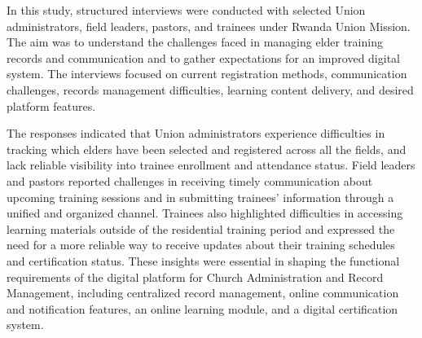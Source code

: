 \documentclass[12pt]{report}
\begin{document}
In this study, structured interviews were conducted with selected Union administrators, field leaders, pastors, and trainees under Rwanda Union Mission. The aim was to understand the challenges faced in managing elder training records and communication and to gather expectations for an improved digital system. The interviews focused on current registration methods, communication challenges, records management difficulties, learning content delivery, and desired platform features.

The responses indicated that Union administrators experience difficulties in tracking which elders have been selected and registered across all the fields, and lack reliable visibility into trainee enrollment and attendance status. Field leaders and pastors reported challenges in receiving timely communication about upcoming training sessions and in submitting trainees' information through a unified and organized channel. Trainees also highlighted difficulties in accessing learning materials outside of the residential training period and expressed the need for a more reliable way to receive updates about their training schedules and certification status. These insights were essential in shaping the functional requirements of the digital platform for Church Administration and Record Management, including centralized record management, online communication and notification features, an online learning module, and a digital certification system.
\end{document}
